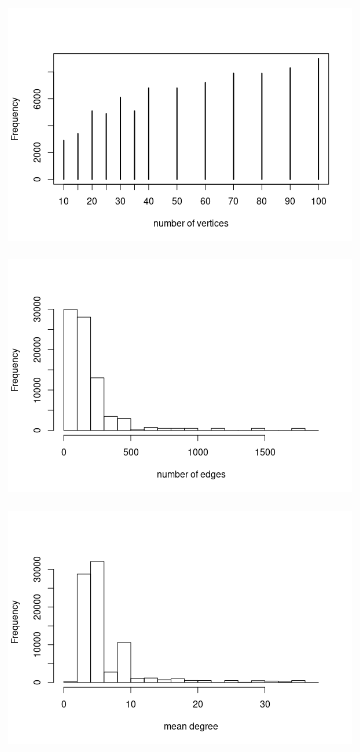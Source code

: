 \documentclass{l4proj}
\theoremstyle{definition}
\theoremstyle{remark}
\begin{document}
\begin{appendices}
  \begin{figure}
    \centering
    \begin{subfigure}[t]{0.49\textwidth}
      \centering
      \includegraphics[width=\textwidth]{images/mcs_vertices.png}
    \end{subfigure}
    \begin{subfigure}[t]{0.49\textwidth}
      \centering
      \includegraphics[width=\textwidth]{images/mcs_edges.png}
    \end{subfigure}
    \begin{subfigure}[t]{0.49\textwidth}
      \centering
      \includegraphics[width=\textwidth]{images/mcs_meandeg.png}

\end{subfigure}
\end{figure}
\end{appendices}
\end{document}
